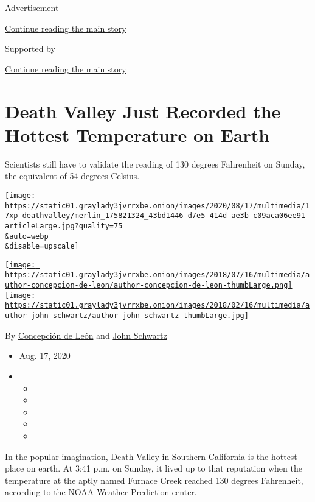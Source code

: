 Advertisement

\protect\hyperlink{after-top}{Continue reading the main story}

Supported by

\protect\hyperlink{after-sponsor}{Continue reading the main story}

\hypertarget{death-valley-just-recorded-the-hottest-temperature-on-earth}{%
\section{Death Valley Just Recorded the Hottest Temperature on
Earth}\label{death-valley-just-recorded-the-hottest-temperature-on-earth}}

Scientists still have to validate the reading of 130 degrees Fahrenheit
on Sunday, the equivalent of 54 degrees Celsius.

\texttt{[image: https://static01.graylady3jvrrxbe.onion/images/2020/08/17/multimedia/17xp-deathvalley/merlin\_175821324\_43bd1446-d7e5-414d-ae3b-c09aca06ee91-articleLarge.jpg?quality=75\\\&auto=webp\\\&disable=upscale]}

\href{https://www.nytimes3xbfgragh.onion/by/concepcion-de-leon}{\texttt{[image: https://static01.graylady3jvrrxbe.onion/images/2018/07/16/multimedia/author-concepcion-de-leon/author-concepcion-de-leon-thumbLarge.png]}}\href{https://www.nytimes3xbfgragh.onion/by/john-schwartz}{\texttt{[image: https://static01.graylady3jvrrxbe.onion/images/2018/02/16/multimedia/author-john-schwartz/author-john-schwartz-thumbLarge.jpg]}}

By
\href{https://www.nytimes3xbfgragh.onion/by/concepcion-de-leon}{Concepción
de León} and
\href{https://www.nytimes3xbfgragh.onion/by/john-schwartz}{John
Schwartz}

\begin{itemize}
\item
  Aug. 17, 2020
\item
  \begin{itemize}
  \item
  \item
  \item
  \item
  \item
  \end{itemize}
\end{itemize}

In the popular imagination, Death Valley in Southern California is the
hottest place on earth. At 3:41 p.m. on Sunday, it lived up to that
reputation when the temperature at the aptly named Furnace Creek reached
130 degrees Fahrenheit, according to the NOAA Weather Prediction center.

